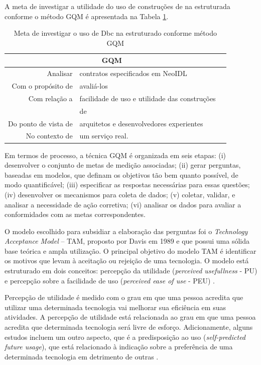 A meta de investigar a utilidade do uso de construções de \designbycontract{} na
\neoidl{} estruturada conforme o método GQM é apresentada na Tabela
\ref{TabelaMetasGQM}.

\begin{table}[h]
\centering
\vspace{0.5cm}
\begin{tabular}{r|lr}
\multicolumn{2}{c}{GQM}\\
\hline    
Analisar & contratos especificados em NeoIDL \\
Com o propósito de  & avaliá-los \\
Com relação a & facilidade de uso e utilidade das construções \\
& de \designbycontract{} \\
Do ponto de vista de & arquitetos e desenvolvedores experientes \\
No contexto de & um serviço real.           
\end{tabular}
\caption{Meta de investigar o uso de Dbc na \neoidl{} estruturado conforme
método GQM}
\label{TabelaMetasGQM}
\end{table}

Em termos de processo, a técnica GQM é organizada em seis etapas: (i)
desenvolver o conjunto de metas de medição associadas; (ii) gerar perguntas,
baseadas em modelos, que definam os objetivos tão bem quanto possível, de modo
quantificável; (iii) especificar as respostas necessárias para essas questões;
(iv) desenvolver os mecanismos para coleta de dados; (v) coletar, validar, e analisar a necessidade de ação corretiva; (vi) analisar
os dados para avaliar a conformidades com as metas correspondentes.

O modelo escolhido para subsidiar a elaboração das perguntas foi o
\textit{Technology Acceptance Model} -- TAM, proposto por Davis em 1989
\cite{davis1989perceived} e que possui uma sólida base teórica e ampla
utilização.
O principal objetivo do modelo TAM é identificar os motivos que levam à aceitação
ou rejeição de uma tecnologia. O modelo está estruturado em dois conceitos:
percepção da utilidade (\textit{perceived usefullness} - PU) e percepção sobre a
facilidade de uso (\textit{perceived ease of use} - PEU)
\cite{hernandes2010avaliaccao}.

Percepção de utilidade é medido com o grau em que uma pessoa acredita que
utilizar uma determinada tecnologia vai melhorar sua eficiência em suas
atividades. A percepção de utilidade está relacionada ao grau em que uma pessoa
acredita que determinada tecnologia será livre de esforço. Adicionamente, alguns
estudos incluem um outro aspecto, que é a predisposição ao uso
(\textit{self-predicted future usage}), que está relacionado à indicação sobre a
preferência de uma determinada tecnologia em detrimento de outras \cite{laitenberger1998evaluating}.


